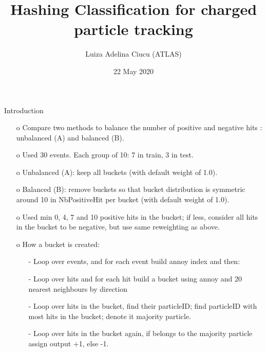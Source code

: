 \documentclass{beamer}
\title[Hashing classification for tracking ]{Hashing Classification for charged particle tracking}
\author[Luiza Adelina Ciucu (ATLAS) ]{Luiza Adelina Ciucu (ATLAS)}
\date{22 May 2020}
\begin{document}
\frame{\titlepage}


\newcommand\inputFolderMerged{../output_new_ev_000_030}
\newcommand\inputFolderOverlay{../output_overlay_balanced_ev_000_030}



\def\volumeID{\texttt{\detokenize{volume_id}}}
\def\layerID{\texttt{\detokenize{layer_id}}}

\def\TP{\ifmmode {\mathrm{TP}}\else
                   \textrm{TP}\fi}%
\def\FP{\ifmmode {\mathrm{FP}}\else
                   \textrm{FP}\fi}%
\def\FN{\ifmmode {\mathrm{FN}}\else
                   \textrm{FN}\fi}%
\def\TN{\ifmmode {\mathrm{TN}}\else
                   \textrm{TN}\fi}%

\begin{frame}{Introduction}
\begin{enumerate}
\item[o] Compare two methods to balance the number of positive and negative hits : unbalanced (A) and balanced (B).
\item[o] Used 30 events. Each group of 10: 7 in train, 3 in test. 
\item[o] Unbalanced (A): keep all buckets (with default weight of 1.0).
\item[o] Balanced (B): remove buckets so that bucket distribution is symmetric around 10 in NbPositiveHit per bucket (with default weight of 1.0).
\item[o] Used min 0, 4, 7 and 10 positive hits in the bucket; if less, consider all hits in the bucket to be negative, but use same reweighting as above.
\item[o] How a bucket is created:
\begin{enumerate}
\item[-] Loop over events, and for each event build annoy index and then:
\item[-] Loop over hits and for each hit build a bucket using annoy and 20 nearest neighbours by direction
\item[-] Loop over hits in the bucket, find their particleID; find particleID with most hits in the bucket; denote it majority particle.
\item[-] Loop over hits in the bucket again, if belongs to the majority particle assign output +1, else -1.
\end{enumerate}
\end{enumerate}
\end{frame}
\clearpage
\end{document}

